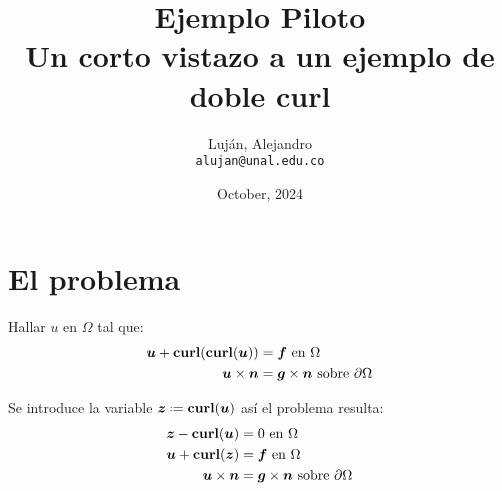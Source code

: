 \documentclass{article}
\title{
   Ejemplo Piloto  \\
  \large Un corto vistazo a un ejemplo de doble curl}
\author{
    Luján, Alejandro\\
    \texttt{alujan@unal.edu.co} 
}
\date{October, 2024}
\begin{document}
\newcommand{\vol}[2]{(#1, #2)_K}
\newcommand{\face}[2]{\langle #1, #2 \rangle_{\partial K}}
\newcommand{\frontier}[2]{\langle #1, #2 \rangle_{\partial \Omega}}

\newcommand*{\defeq}{\mathrel{\vcenter{\baselineskip0.5ex \lineskiplimit0pt \hbox{\scriptsize.}\hbox{\scriptsize.}}}=}
\newcommand{\refeq}[1]{(\ref{#1})}
\newcommand{\vect}[1]{\boldsymbol{#1}}

\newcommand*{\curl}[1]{\textbf{\textup{curl}}(\vect{#1})}


\maketitle


\section{El problema}

\noindent Hallar $u$ en $\Omega$ tal que:
\begin{align*}
    \vect{u} + \textbf{curl}(\curl{u}) &= \vect{f}~\textup{en}~\Omega \\
    \vect{u} \times \vect{n} &= \vect{g} \times \vect{n}~\textup{sobre}~\partial \Omega
\end{align*}

\noindent Se introduce la variable $\vect{z} \defeq \curl{u}$ así el problema resulta:
\begin{align*}
    \vect{z} - \curl{u} &= 0~\textup{en}~\Omega \\
    \vect{u} + \curl{z} &= \vect{f}~\textup{en}~\Omega \\
    \vect{u} \times \vect{n} &= \vect{g} \times \vect{n}~\textup{sobre}~\partial \Omega
\end{align*}
\end{document}
